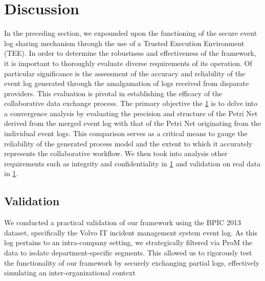 \section{Discussion}
\label{sec:evaluation}

In the preceding section, we expounded upon the functioning of the secure event log sharing mechanism through the use of a Trusted Execution Environment (TEE). In order to determine the robustness and effectiveness of the framework, it is important to thoroughly evaluate diverse requirements of its operation.
Of particular significance is the assessment of the accuracy and reliability of the event log generated through the amalgamation of logs received from disparate providers. This evaluation is pivotal in establishing the efficacy of the collaborative data exchange process. The primary objective the \cref{sec:evaluation} is to delve into a convergence analysis by evaluating the precision and structure of the Petri Net 
derived from the merged event log with that of the Petri Net originating from the individual event logs. This comparison serves as a critical means to gauge the reliability of the generated process model and the extent to which it accurately represents the collaborative workflow. We then took into analysis other requirements such as integrity and confidentiality in \cref{sec:evaluation} and validation on real data in \cref{sec:evaluation}.

\subsection{Validation}
We conducted a practical validation of our framework using the BPIC 2013 dataset,
specifically the Volvo IT incident management system event log. As this log pertains to an intra-company setting, we strategically filtered via ProM the data to isolate department-specific segments. This allowed us to rigorously test the functionality of our framework by securely exchanging partial logs, effectively simulating an inter-organizational context


